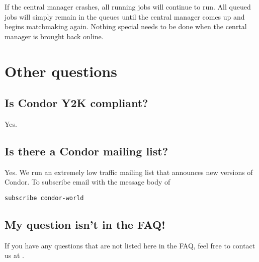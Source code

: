 If the central manager crashes, all running jobs will continue to
run. All queued jobs will simply remain in the queues until the central
manager comes up and begins matchmaking again.  Nothing special needs
to be done when the cenrtal manager is brought back online. 


\section{Other questions}


\subsection{Is Condor Y2K compliant?}

Yes.

\subsection{Is there a Condor mailing list?}

Yes.  We run an extremely low traffic mailing list that announces new versions of Condor.
To subscribe email
with the message body of
\begin{verbatim}
subscribe condor-world
\end{verbatim}

\subsection{My question isn't in the FAQ!}

If you have any questions that are not listed here in the FAQ, feel free to contact us at .
